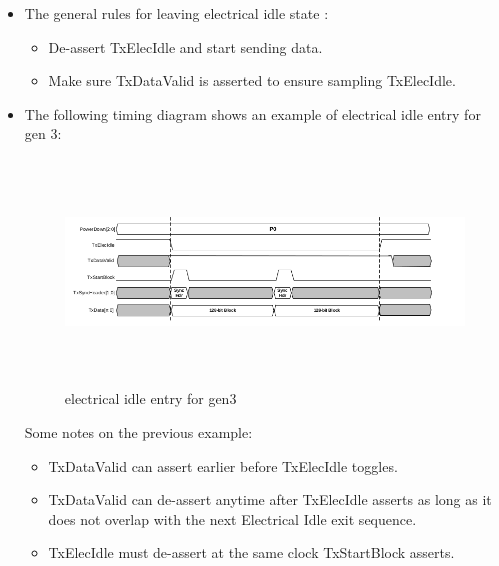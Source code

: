 \begin{itemize}
\begin{itemize}
\end{itemize}
\item The general rules for leaving electrical idle state :
\begin{itemize}
    \item De-assert TxElecIdle and start sending data.
    \item Make sure TxDataValid is asserted to ensure sampling TxElecIdle.

\end{itemize}
\item The following timing diagram shows an example of electrical idle entry for gen 3:
\begin{figure}[H]
  \centering
  \includegraphics[width=130mm,height=60mm]{images/clk_diagram/EIGen3.png}
  \caption{electrical idle entry for gen3}
  \label{lane}
\end{figure}
Some notes on the previous example:
\begin{itemize}
    \item TxDataValid can assert earlier before TxElecIdle toggles.

    \item TxDataValid can de-assert anytime after TxElecIdle asserts as long as it does not overlap with the next Electrical Idle exit sequence.

    \item TxElecIdle must de-assert at the same clock TxStartBlock asserts.



\end{itemize}
    \end{itemize}
